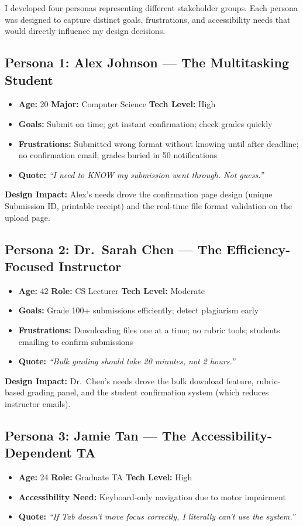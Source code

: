 \documentclass[12pt, a4paper]{article}
\begin{document}
I developed four personas representing different stakeholder groups. Each persona was designed to capture distinct goals, frustrations, and accessibility needs that would directly influence my design decisions.

\subsection{Persona 1: Alex Johnson — The Multitasking Student}
\begin{itemize}[noitemsep]
  \item \textbf{Age:} 20 \quad \textbf{Major:} Computer Science \quad \textbf{Tech Level:} High
  \item \textbf{Goals:} Submit on time; get instant confirmation; check grades quickly
  \item \textbf{Frustrations:} Submitted wrong format without knowing until after deadline; no confirmation email; grades buried in 50 notifications
  \item \textbf{Quote:} \textit{``I need to KNOW my submission went through. Not guess.''}
\end{itemize}

\textbf{Design Impact:} Alex's needs drove the confirmation page design (unique Submission ID, printable receipt) and the real-time file format validation on the upload page.

\subsection{Persona 2: Dr.\ Sarah Chen — The Efficiency-Focused Instructor}
\begin{itemize}[noitemsep]
  \item \textbf{Age:} 42 \quad \textbf{Role:} CS Lecturer \quad \textbf{Tech Level:} Moderate
  \item \textbf{Goals:} Grade 100+ submissions efficiently; detect plagiarism early
  \item \textbf{Frustrations:} Downloading files one at a time; no rubric tools; students emailing to confirm submissions
  \item \textbf{Quote:} \textit{``Bulk grading should take 20 minutes, not 2 hours.''}
\end{itemize}

\textbf{Design Impact:} Dr.\ Chen's needs drove the bulk download feature, rubric-based grading panel, and the student confirmation system (which reduces instructor emails).

\subsection{Persona 3: Jamie Tan — The Accessibility-Dependent TA}
\begin{itemize}[noitemsep]
  \item \textbf{Age:} 24 \quad \textbf{Role:} Graduate TA \quad \textbf{Tech Level:} High
  \item \textbf{Accessibility Need:} Keyboard-only navigation due to motor impairment
  \item \textbf{Quote:} \textit{``If Tab doesn't move focus correctly, I literally can't use the system.''}
\end{itemize}
\end{document}
